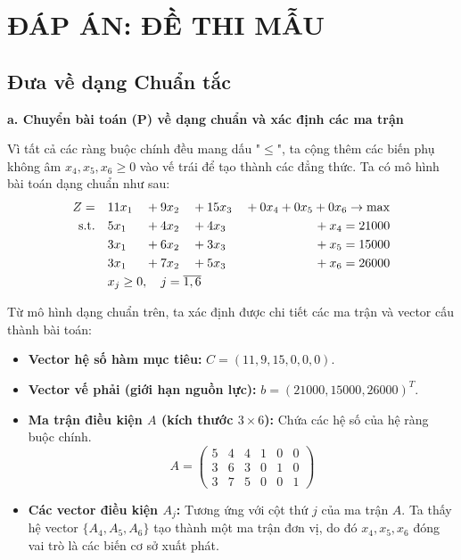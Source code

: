 \section{ĐÁP ÁN: ĐỀ THI MẪU}

\subsection{Đưa về dạng Chuẩn tắc}
\textbf{a. Chuyển bài toán (P) về dạng chuẩn và xác định các ma trận} 

Vì tất cả các ràng buộc chính đều mang dấu "$\le$", ta cộng thêm các biến phụ không âm $x_4, x_5, x_6 \ge 0$ vào vế trái để tạo thành các đẳng thức. Ta có mô hình bài toán dạng chuẩn như sau:
\begin{alignat*}{4}
    Z = \quad & 11x_1 & {}+{} & 9x_2 & {}+{} & 15x_3 & {}+{} 0x_4 + 0x_5 + 0x_6 \rightarrow \max \\
    \text{s.t.} \quad & 5x_1 & {}+{} & 4x_2 & {}+{} & 4x_3 & {}+{} x_4 = 21000 \\
    & 3x_1 & {}+{} & 6x_2 & {}+{} & 3x_3 & {}+{} x_5 = 15000 \\
    & 3x_1 & {}+{} & 7x_2 & {}+{} & 5x_3 & {}+{} x_6 = 26000 \\
    & \rlap{$x_j \ge 0, \quad j = \overline{1,6}$}
\end{alignat*}

Từ mô hình dạng chuẩn trên, ta xác định được chi tiết các ma trận và vector cấu thành bài toán:
\begin{itemize}
    \item \textbf{Vector hệ số hàm mục tiêu:} $C = (11, 9, 15, 0, 0, 0)$.
    \item \textbf{Vector vế phải (giới hạn nguồn lực):} $b = (21000, 15000, 26000)^T$.
    \item \textbf{Ma trận điều kiện $A$ (kích thước $3 \times 6$):} Chứa các hệ số của hệ ràng buộc chính.
    \begin{equation*}
        A = \begin{pmatrix}
            5 & 4 & 4 & 1 & 0 & 0 \\
            3 & 6 & 3 & 0 & 1 & 0 \\
            3 & 7 & 5 & 0 & 0 & 1
        \end{pmatrix}
    \end{equation*}
    \item \textbf{Các vector điều kiện $A_j$:} Tương ứng với cột thứ $j$ của ma trận $A$. Ta thấy hệ vector $\{A_4, A_5, A_6\}$ tạo thành một ma trận đơn vị, do đó $x_4, x_5, x_6$ đóng vai trò là các biến cơ sở xuất phát.
\end{itemize}


